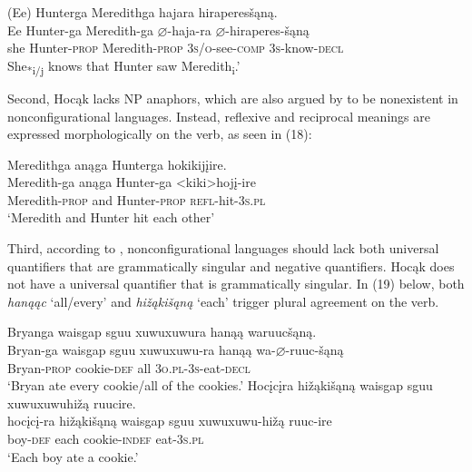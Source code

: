 \documentclass[output=paper]{LSP/langsci}
\begin{document}
\begin{exe}
\ex	
\glll (Ee) 	Hunterga 	Meredithga		hajara 						hiraperes\v{s}\k{a}n\k{a}. \\
 Ee 		Hunter-ga 	Meredith-ga 		$\varnothing$-haja-ra 				$\varnothing$-hiraperes-\v{s}\k{a}n\k{a} \\
she 		Hunter-\textsc{prop} 	Meredith-\textsc{prop} 	\textsc{3s/o}-see-\textsc{comp} 	\textsc{3s}-know-\textsc{decl}  \\
\trans She\textsubscript{*i/j} knows that Hunter saw Meredith\textsubscript{i}.'
\end{exe}	

Second, Hoc\k{a}k lacks NP anaphors, which are also argued by \citet{Baker1996} to be nonexistent in nonconfigurational languages. Instead, reflexive and reciprocal meanings are expressed morphologically on the verb, as seen in (18):

\begin{exe}
\ex 
\glll Meredithga		an\k{a}ga 	Hunterga 			hokikij\k{i}ire.\\
Meredith-ga	 	an\k{a}ga 	Hunter-ga 			<kiki>hoj\k{i}-ire \\
Meredith-\textsc{prop} and 		Hunter-\textsc{prop} 	\textsc{refl}-hit-\textsc{3s.pl} \\
\trans `Meredith and Hunter hit each other'
\end{exe}
	
Third, according to \citet{Baker1996}, nonconfigurational languages should lack both universal quantifiers that are grammatically singular and negative quantifiers. Hoc\k{a}k does not have a universal quantifier that is grammatically singular.  In (19) below, both \textit{han\k{a}\k{a}c} `all/every' and \textit{hi\v{z}\k{a}ki\v{s}\k{a}n\k{a}} `each' trigger plural agreement on the verb.

\begin{exe}
\ex	
\begin{xlist}
\ex	
\glll Bryanga {waisgap sguu xuwuxuwura} 	han\k{a}\k{a} 	waruuc\v{s}\k{a}n\k{a}.\\
Bryan-ga 	{waisgap sguu xuwuxuwu-ra} 	han\k{a}\k{a} 	wa-$\varnothing$-ruuc-\v{s}\k{a}n\k{a} \\
	Bryan-\textsc{prop} 	cookie-\textsc{def}	all 		\textsc{3o.pl-3s}-eat-\textsc{decl} \\
\trans `Bryan ate every cookie/all of the cookies.'
\ex 
\glll Hoc\k{i}c\k{i}ra 	hi\v{z}\k{a}ki\v{s}\k{a}n\k{a} 	{waisgap sguu xuwuxuwuhi\v{z}\k{a} }		ruucire.\\
hoc\k{i}c\k{i}-ra 	hi\v{z}\k{a}ki\v{s}\k{a}n\k{a} 	{waisgap sguu xuwuxuwu-hi\v{z}\k{a} }		ruuc-ire \\
	boy-\textsc{def} 		each 					cookie-\textsc{indef}		eat-\textsc{3s.pl}\\
\trans `Each boy ate a cookie.'
\end{xlist}
\end{exe}
\end{document}
